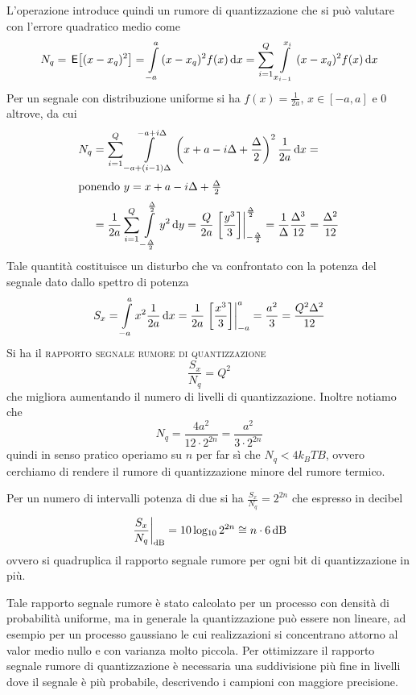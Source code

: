L'operazione introduce quindi un rumore di quantizzazione che si può valutare con l'errore quadratico medio come
\[N_q=\E{(x-x_q)^2}=\intd{-a}{a}{(x-x_q)^2 f(x)}{x}=\sum_{i=1}^{Q}\intd{x_{i-1}}{x_i}{(x-x_q)^2 f(x)}{x}\]
Per un segnale con distribuzione uniforme si ha $f(x)=\frac{1}{2a},\,x\in[-a,a]$ e 0 altrove, da cui
\[\begin{split}N_q&=\sum_{i=1}^{Q}\intd{-a+(i-1)\Delta}{-a+i\Delta}{\left(x+a-i\Delta+\frac{\Delta}{2}\right)^2 \frac{1}{2a}}{x}=\\\intertext{ponendo $y=x+a-i\Delta+\frac{\Delta}{2}$}&=\frac{1}{2a}\sum_{i=1}^{Q}\intd{-\frac{\Delta}{2}}{\frac{\Delta}{2}}{y^2}{y}=\frac{Q}{2a}\bound{-\frac{\Delta}{2}}{\frac{\Delta}{2}}{\frac{y^3}{3}}=\frac{1}{\Delta}\frac{\Delta^3}{12}=\frac{\Delta^2}{12}
\end{split}\]
Tale quantità costituisce un disturbo che va confrontato con la potenza del segnale dato dallo spettro di potenza
\[S_x=\intd{-a}{a}{x^2\frac{1}{2a}}{x}=\frac{1}{2a}\bound{-a}{a}{\frac{x^3}{3}}=\frac{a^2}{3}=\frac{Q^2\Delta^2}{12}\]
Si ha il \textsc{rapporto segnale rumore di quantizzazione}
\begin{equation}
\frac{S_x}{N_q}=Q^2
\end{equation}
che migliora aumentando il numero di livelli di quantizzazione.
Inoltre notiamo che
\[N_q = \frac{4a^2}{12\cdot2^{2n}} = \frac{a^2}{3\cdot2^{2n}}\]
quindi in senso pratico operiamo su $n$ per far sì che $N_q < 4k_BTB$, ovvero cerchiamo di rendere il rumore di quantizzazione minore del rumore termico.

Per un numero di intervalli potenza di due si ha $\frac{S_x}{N_q}=2^{2n}$ che espresso in decibel
\[\restrict{\frac{S_x}{N_q}}{\text{dB}}=10\Log 2^{2n}\cong n\cdot\SI{6}{\decibel}\]
ovvero si quadruplica il rapporto segnale rumore per ogni bit di quantizzazione in più.

Tale rapporto segnale rumore è stato calcolato per un processo con densità di probabilità uniforme, ma in generale la quantizzazione può essere non lineare, ad esempio per un processo gaussiano le cui realizzazioni si concentrano attorno al valor medio nullo e con varianza molto piccola. Per ottimizzare il rapporto segnale rumore di quantizzazione è necessaria una suddivisione più fine in livelli dove il segnale è più probabile, descrivendo i campioni con maggiore precisione.

